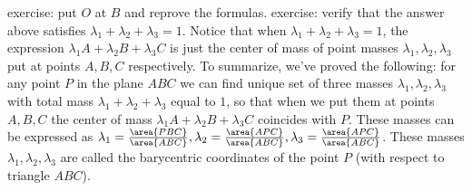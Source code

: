exercise: put $O$ at $B$ and reprove the formulas.
exercise: verify that the answer above satisfies $\lambda_1+\lambda_2+\lambda_3=1$.
Notice that when $\lambda_1+\lambda_2+\lambda_3=1$, the expression $\lambda_1 A+\lambda_2 B+\lambda_3 C$ is just the center of mass of point masses $\lambda_1,\lambda_2,\lambda_3$ put at points $A,B,C$ respectively.
To summarize, we've proved the following: for any point $P$ in the plane $ABC$ we can find unique set of three masses $\lambda_1,\lambda_2,\lambda_3$ with total mass $\lambda_1+\lambda_2+\lambda_3$ equal to $1$, so that when we put them at points $A,B,C$ the center of mass $\lambda_1 A+\lambda_2 B+\lambda_3 C$ coincides with $P$. These masses can be expressed as $\lambda_1=\frac{\area{PBC}}{\area{ABC}},\lambda_2=\frac{\area{APC}}{\area{ABC}},\lambda_3=\frac{\area{APC}}{\area{ABC}}$. These masses $\lambda_1,\lambda_2,\lambda_3$ are called the barycentric coordinates of the point $P$ (with respect to triangle $ABC$).
